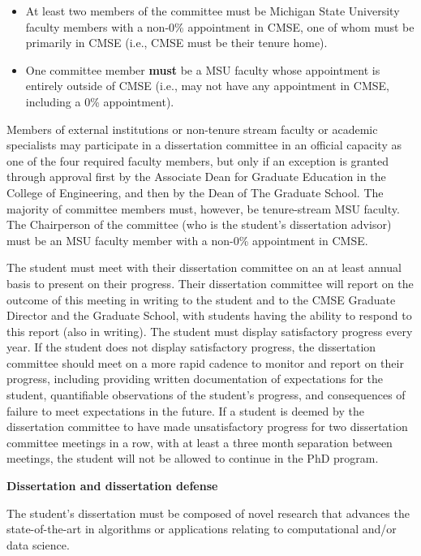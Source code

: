 \begin{itemize}
\item At least two members of the committee must be Michigan State
  University faculty members with a non-0\% appointment in CMSE, one
  of whom must be primarily in CMSE (i.e., CMSE must be their tenure
  home).

\item One committee member \textbf{must} be a MSU faculty whose appointment
  is entirely outside of CMSE (i.e., may not have any appointment in
  CMSE, including a 0\% appointment).

\end{itemize}

Members of external institutions or non-tenure stream faculty or
academic specialists may participate in a dissertation committee in an
official capacity as one of the four required faculty members, but
only if an exception is granted through approval first by the
Associate Dean for Graduate Education in the College of Engineering,
and then by the Dean of The Graduate School.  The majority of
committee members must, however, be tenure-stream MSU faculty.  The
Chairperson of the committee (who is the student's dissertation
advisor) must be an MSU faculty member with a non-0\% appointment in
CMSE.

The student must meet with their dissertation committee on an at least
annual basis to present on their progress.  Their dissertation
committee will report on the outcome of this meeting in writing to the
student and to the CMSE Graduate Director and the Graduate School,
with students having the ability to respond to this report (also in
writing).
The student must display satisfactory progress every year.  If the
student does not display satisfactory progress, the dissertation
committee should meet on a more rapid cadence to monitor and report on
their progress, including providing written documentation of
expectations for the student, quantifiable observations of the
student's progress, and consequences of failure to meet expectations
in the future.  If a student is deemed by the dissertation committee
to have made unsatisfactory progress for two dissertation committee
meetings in a row, with at least a three month separation between
meetings, the student will not be allowed to continue in the PhD
program.

\vspace{3mm}
\noindent
\textbf{Dissertation and dissertation defense}

The student's dissertation must be composed of novel research that
advances the state-of-the-art in algorithms or applications relating
to computational and/or data science.

